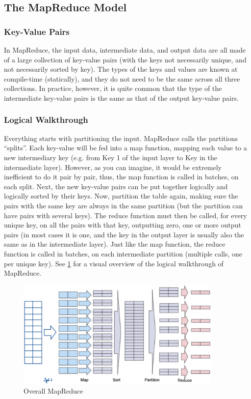 \subsection{The MapReduce Model}

\subsubsection{Key-Value Pairs}
In MapReduce, the input data, intermediate data, and output data are all made of a large collection of key-value pairs (with the keys not necessarily unique, and not necessarily sorted by key). The types of the keys and values are known at compile-time (statically), and they do not need to be the same across all three collections. In practice, however, it is quite common that the type of the intermediate key-value pairs is the same as that of the output key-value pairs.

\subsubsection{Logical Walkthrough}
Everything starts with partitioning the input. MapReduce calls the partitions “splits”. Each key-value will be fed into a map function, mapping each value to a new intermediary key (e.g. from Key 1 of the input layer to Key  in the intermediate layer). However, as you can imagine, it would be extremely inefficient to do it pair by pair, thus, the map function is called in batches, on each split. Next, the new key-value pairs can be put together logically and logically sorted by their keys. Now, partition the table again, making sure the pairs with the same key are always in the same partition (but the partition can have pairs with several keys). The reduce function must then be called, for every unique key, on all the pairs with that key, outputting zero, one or more output pairs (in most cases it is one, and the key in the output layer is usually also the same as in the intermediate layer). Just like the map function, the reduce function is called in batches, on each intermediate partition (multiple calls, one per unique key). See \cref{fig:OverallMapRed} for a visual overview of the logical walkthrough of MapReduce.

\begin{figure}[h]
    \centering
    \includegraphics[width=0.9\textwidth]{Figures/OverallMapReduce.png}
    \caption{Overall MapReduce}\label{fig:OverallMapRed}
\end{figure}

